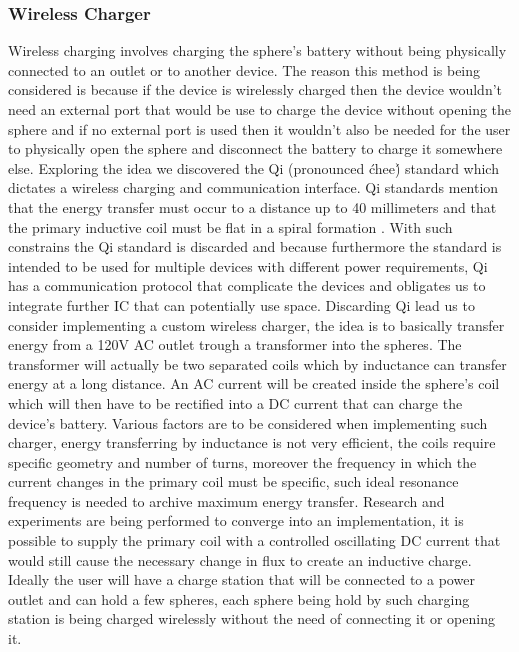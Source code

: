 \subsubsection{Wireless Charger}
Wireless charging involves charging the sphere's battery without being physically connected to an outlet or to another device. The reason this method is being considered is because if the device is wirelessly charged then the device wouldn't need an external port that would be use to charge the device without opening the sphere and if no external port is used then it wouldn't also be needed for the user to physically open the sphere and disconnect the battery to charge it somewhere else. Exploring the idea we discovered the Qi (pronounced \'chee\') standard which dictates a wireless charging and communication interface. Qi standards mention that the energy transfer must occur to a distance up to 40 millimeters and that the primary inductive coil must be flat in a spiral formation \cite{QiStandard}. With such constrains the Qi standard is discarded and because furthermore the standard is intended to be used for multiple devices with different power requirements, Qi has a communication protocol that complicate the devices and obligates us to integrate further IC that can potentially use space. Discarding Qi lead us to consider implementing a custom wireless charger, the idea is to basically transfer energy from a 120V AC outlet trough a transformer into the spheres. The transformer will actually be two separated coils which by inductance can transfer energy at a long distance. An AC current will be created inside the sphere's coil which will then have to be rectified into a DC current that can charge the device's battery. Various factors are to be considered when implementing such charger, energy transferring by inductance is not very efficient, the coils require specific geometry and number of turns, moreover the frequency in which the current changes in the primary coil must be specific, such ideal resonance frequency is needed to archive maximum energy transfer. Research and experiments are being performed to converge into an implementation, it is possible to supply the primary coil with a controlled oscillating DC current that would still cause the necessary change in flux to create an inductive charge. Ideally the user will have a charge station that will be connected to a power outlet and can hold a few spheres, each sphere being hold by such charging station is being charged wirelessly without the need of connecting it or opening it. 
